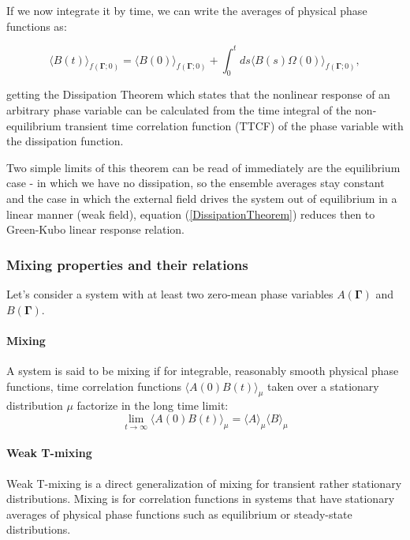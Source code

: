 \documentclass[a4paper,12pt]{article}
\begin{document}
If we now integrate it by time, we can write the averages of physical phase functions as:

\begin{equation}
\label{DissipationTheorem}
\langle B(t)\rangle_{f(\bm{\Gamma};0)} =\langle B(0) \rangle_{f(\bm{\Gamma};0)} +\int_0^t ds \langle B(s) \Omega(0) \rangle_{f(\bm{\Gamma};0)}, 
\end{equation}

getting the Dissipation Theorem which states that the nonlinear response of an arbitrary phase variable can be calculated from the time integral of the non-equilibrium transient time correlation function (TTCF) of the phase variable with the dissipation function.


Two simple limits of this theorem can be read of immediately are the  equilibrium case - in which we have no dissipation, so the ensemble averages stay constant and the case in which the external field drives the system out of equilibrium in a linear manner (weak field), equation (\ref{DissipationTheorem}) reduces then to Green-Kubo linear response relation.

\subsubsection{Mixing properties and their relations}

Let's consider a system with at least two zero-mean phase variables $A(\bm{\Gamma})$ and $B(\bm{\Gamma})$. 

\paragraph{Mixing}

A system is said to be mixing if for integrable, reasonably smooth physical phase functions, time correlation functions $\langle A(0) B(t) \rangle_{\mu}$ taken over a stationary distribution $\mu$ factorize in the long time limit:
\begin{equation}
  \lim_{t \to \infty} \langle A(0) B(t)\rangle_{\mu} = \langle A \rangle_{\mu} \langle B \rangle_{\mu}  
\end{equation}

\paragraph{Weak T-mixing}

Weak T-mixing is a direct generalization of mixing for transient rather stationary distributions. Mixing is for correlation functions in systems that have stationary averages of physical phase functions such as equilibrium or steady-state distributions.
\end{document}
